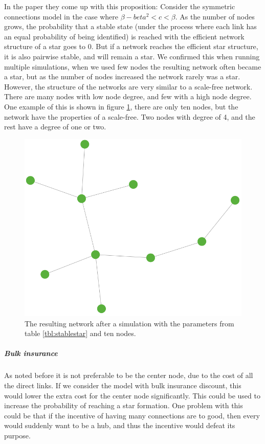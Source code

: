 In the paper \cite{jackson2005survey} they come up with this proposition:
Consider the symmetric connections model in the case where $\beta-beta^2<c<\beta$. As the number of nodes grows, the probability that a stable state (under the
process where each link has an equal probability of being identified) is reached with the
efficient network structure of a star goes to 0. But if a network reaches the efficient star structure, it is also pairwise stable, and will remain a star. 
We confirmed this when running multiple simulations, when we used few nodes the resulting network often became a star, but as the number of nodes increased the network rarely was a star. 
However, the structure of the networks are very similar to a scale-free network. There are many nodes with low node degree, and few with a high node degree.
One example of this is shown in figure \ref{fig:stablescalefree}, there are only ten nodes, but the network have the properties of a scale-free. Two nodes with degree of 4, and the rest have a degree of one or two.
\begin{figure}[h]
\centering
  \includegraphics[width=0.5\linewidth]{../Figures/stability/Unefficientbutstabletwo.png}
  \caption{\label{fig:stablescalefree} The resulting network after a simulation with the parameters from table \ref{tbl:stablestar} and ten nodes.}
\end{figure}
\subparagraph{Bulk insurance}
As noted before it is not preferable to be the center node, due to the cost of all the direct links. If we consider the model with bulk insurance discount, this would lower the extra cost for the center node significantly. This could be used to increase the probability of reaching a star formation. One problem with this could be that if the incentive of having many connections are to good, then every would suddenly want to be a hub, and thus the incentive would defeat its purpose. 

